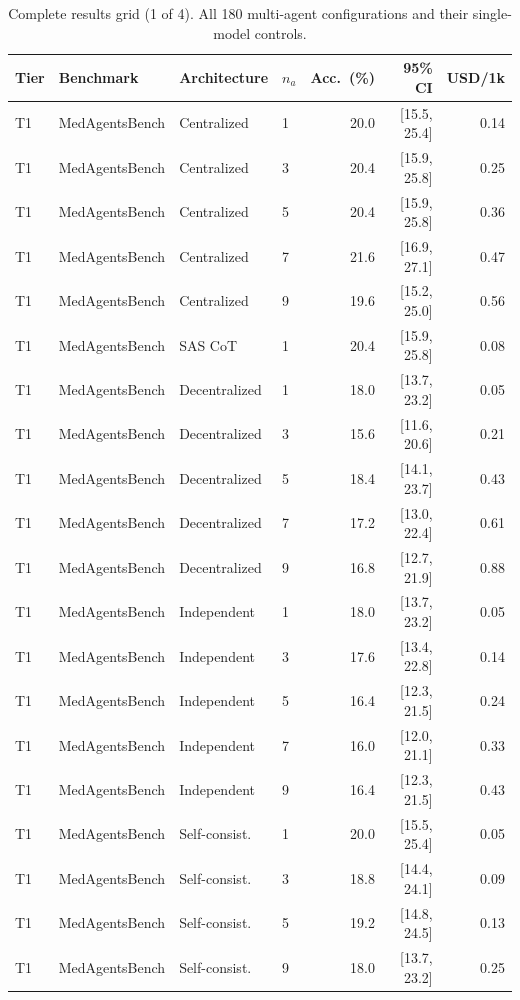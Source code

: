 \begin{table}[t]\centering\scriptsize
\caption{Complete results grid (1 of 4). All 180 multi-agent configurations and their single-model controls.}
\label{tab:full}
\begin{tabular}{@{}llllrrr@{}}
\toprule
Tier & Benchmark & Architecture & $n_a$ & Acc.\ (\%) & 95\% CI & USD/1k \\
\midrule
T1 & MedAgentsBench & Centralized & 1 & 20.0 & [15.5, 25.4] & 0.14 \\
T1 & MedAgentsBench & Centralized & 3 & 20.4 & [15.9, 25.8] & 0.25 \\
T1 & MedAgentsBench & Centralized & 5 & 20.4 & [15.9, 25.8] & 0.36 \\
T1 & MedAgentsBench & Centralized & 7 & 21.6 & [16.9, 27.1] & 0.47 \\
T1 & MedAgentsBench & Centralized & 9 & 19.6 & [15.2, 25.0] & 0.56 \\
T1 & MedAgentsBench & SAS CoT & 1 & 20.4 & [15.9, 25.8] & 0.08 \\
T1 & MedAgentsBench & Decentralized & 1 & 18.0 & [13.7, 23.2] & 0.05 \\
T1 & MedAgentsBench & Decentralized & 3 & 15.6 & [11.6, 20.6] & 0.21 \\
T1 & MedAgentsBench & Decentralized & 5 & 18.4 & [14.1, 23.7] & 0.43 \\
T1 & MedAgentsBench & Decentralized & 7 & 17.2 & [13.0, 22.4] & 0.61 \\
T1 & MedAgentsBench & Decentralized & 9 & 16.8 & [12.7, 21.9] & 0.88 \\
T1 & MedAgentsBench & Independent & 1 & 18.0 & [13.7, 23.2] & 0.05 \\
T1 & MedAgentsBench & Independent & 3 & 17.6 & [13.4, 22.8] & 0.14 \\
T1 & MedAgentsBench & Independent & 5 & 16.4 & [12.3, 21.5] & 0.24 \\
T1 & MedAgentsBench & Independent & 7 & 16.0 & [12.0, 21.1] & 0.33 \\
T1 & MedAgentsBench & Independent & 9 & 16.4 & [12.3, 21.5] & 0.43 \\
T1 & MedAgentsBench & Self-consist. & 1 & 20.0 & [15.5, 25.4] & 0.05 \\
T1 & MedAgentsBench & Self-consist. & 3 & 18.8 & [14.4, 24.1] & 0.09 \\
T1 & MedAgentsBench & Self-consist. & 5 & 19.2 & [14.8, 24.5] & 0.13 \\
T1 & MedAgentsBench & Self-consist. & 9 & 18.0 & [13.7, 23.2] & 0.25 \\

\end{tabular}
\end{table}
